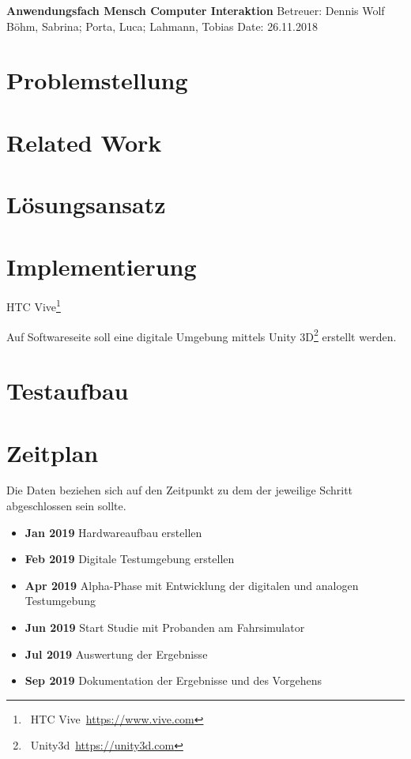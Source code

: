 \documentclass[a4paper, 11pt]{article}
\begin{document}
\noindent
\large\textbf{Anwendungsfach Mensch Computer Interaktion} \hfill Betreuer: Dennis Wolf \\
\normalsize Böhm, Sabrina; Porta, Luca; Lahmann, Tobias \hfill Date: 26.11.2018 \\


\section*{Problemstellung}


\section*{Related Work}


\section*{Lösungsansatz}


\section*{Implementierung}
HTC Vive\footnote{~HTC Vive~\url{https://www.vive.com}}

Auf Softwareseite soll eine digitale Umgebung mittels Unity 3D\footnote{~Unity3d~\url{https://unity3d.com}} erstellt werden.

\section*{Testaufbau}

\section*{Zeitplan}
Die Daten beziehen sich auf den Zeitpunkt zu dem der jeweilige Schritt abgeschlossen sein sollte.
\begin{itemize}
    \item \textbf{Jan 2019} Hardwareaufbau erstellen
    \item \textbf{Feb 2019} Digitale Testumgebung erstellen
    \item \textbf{Apr 2019} Alpha-Phase mit Entwicklung der digitalen und analogen Testumgebung
    \item \textbf{Jun 2019} Start Studie mit Probanden am Fahrsimulator
    \item \textbf{Jul 2019} Auswertung der Ergebnisse
    \item \textbf{Sep 2019} Dokumentation der Ergebnisse und des Vorgehens
\end{itemize}
\end{document}
